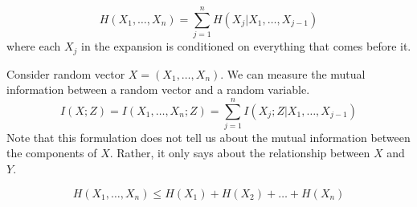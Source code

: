 \begin{definition}
	\begin{equation}
		H(X_1, \dots, X_n) = \sum_{j = 1}^n H(X_j | X_1, \dots, X_{j - 1}) 
	\end{equation}
	where each $X_j$ in the expansion is conditioned on everything that comes before it. 
\end{definition}

\begin{definition}
	Consider random vector $X = (X_1, \dots, X_n)$. We can measure the mutual information between a random vector and a random variable. 
	\begin{equation}
		I(X; Z) = I(X_1, \dots, X_n ; Z) = \sum_{j = 1}^n I (X_j ; Z | X_1, \dots , X_{j - 1})
	\end{equation}
	Note that this formulation does not tell us about the mutual information between the components of $X$. Rather, it only says about the relationship between $X$ and $Y$. 
\end{definition}

\begin{proposition}
	\begin{equation}
		H(X_1, \dots, X_n) \leq H(X_1) + H(X_2) + \dots + H(X_n)
	\end{equation}
\end{proposition}

